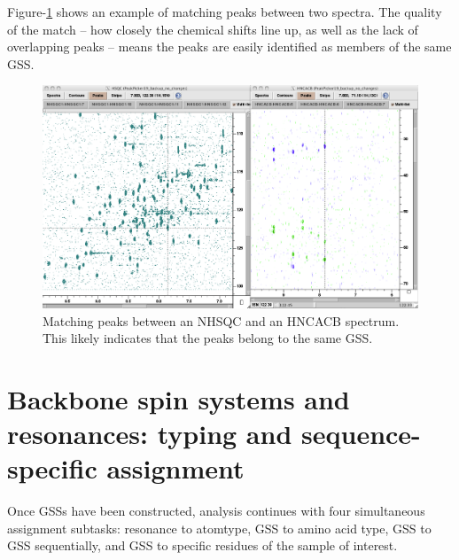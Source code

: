 Figure-\ref{nhsqc_hncacb} shows an example of matching peaks between two
spectra.  The quality of the match -- how closely the chemical shifts line up,
as well as the lack of overlapping peaks -- means the peaks are easily
identified as members of the same GSS.
\begin{figure}
  \includegraphics[scale=0.3]{figures/nhsqc_hncacb}
  \caption[Matching peaks between an NHSQC and an HNCACB spectrum]
          {Matching peaks between an NHSQC and an HNCACB spectrum.
           This likely indicates that the peaks belong to the same GSS.}
  \label{nhsqc_hncacb}
\end{figure}



\section{Backbone spin systems and resonances: typing and sequence-specific assignment}

Once GSSs have been constructed, analysis continues with four simultaneous 
assignment subtasks: resonance to atomtype, GSS to amino acid type, GSS to
GSS sequentially, and GSS to specific residues of the sample of interest.

